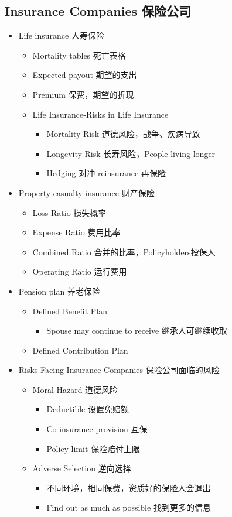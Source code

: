 \documentclass[a4paper,6pt,twoside,openany]{article}
\begin{document}
\subsection{Insurance Companies 保险公司}
\begin{itemize}
\item Life insurance 人寿保险
  \begin{itemize}
  \item Mortality tables 死亡表格
  \item Expected payout 期望的支出
  \item Premium 保费，期望的折现
  \item Life Insurance-Risks in Life Insurance
    \begin{itemize}
    \item Mortality Risk 道德风险，战争、疾病导致
    \item Longevity Risk 长寿风险，People living longer
    \item Hedging 对冲 reinsurance 再保险
    \end{itemize}
  \end{itemize}
\item Property-casualty insurance 财产保险
  \begin{itemize}
  \item Loss Ratio 损失概率
  \item Expense Ratio 费用比率
  \item Combined Ratio 合并的比率，Policyholders投保人
  \item Operating Ratio 运行费用
  \end{itemize}
\item Pension plan 养老保险
  \begin{itemize}
  \item Defined Benefit Plan
    \begin{itemize}
    \item Spouse may continue to receive 继承人可继续收取
    \end{itemize}
  \item Defined Contribution Plan
  \end{itemize}
\item Risks Facing Insurance Companies 保险公司面临的风险
  \begin{itemize}
  \item Moral Hazard 道德风险
    \begin{itemize}
    \item Deductible 设置免赔额
    \item Co-insurance provision 互保 
      \item Policy limit 保险赔付上限
    \end{itemize}
  \item Adverse Selection 逆向选择
    \begin{itemize}
    \item 不同环境，相同保费，资质好的保险人会退出
    \item Find out as much as possible 找到更多的信息
    \end{itemize}
  \end{itemize}
\end{itemize}
\end{document}
